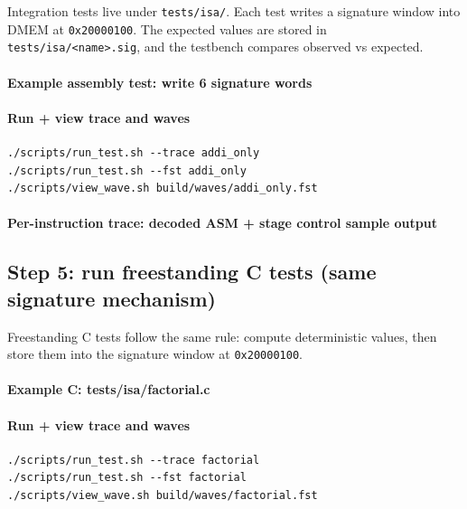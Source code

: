 Integration tests live under \texttt{tests/isa/}. Each test writes a signature
window into DMEM at \texttt{0x20000100}. The expected values are stored in
\texttt{tests/isa/<name>.sig}, and the testbench compares observed vs expected.

\paragraph{Example assembly test: write 6 signature words}


\paragraph{Run + view trace and waves}
\begin{lstlisting}[style=minrv]
./scripts/run_test.sh --trace addi_only
./scripts/run_test.sh --fst addi_only
./scripts/view_wave.sh build/waves/addi_only.fst
\end{lstlisting}

\paragraph{Per-instruction trace: decoded ASM + stage control sample output}


\subsection{Step 5: run freestanding C tests (same signature mechanism)}

Freestanding C tests follow the same rule: compute deterministic values, then
store them into the signature window at \texttt{0x20000100}.

\paragraph{Example C: tests/isa/factorial.c}


\paragraph{Run + view trace and waves}
\begin{lstlisting}[style=minrv]
./scripts/run_test.sh --trace factorial
./scripts/run_test.sh --fst factorial
./scripts/view_wave.sh build/waves/factorial.fst
\end{lstlisting}

